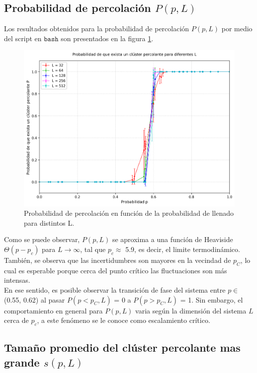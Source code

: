 \documentclass[12pt,a4paper]{article}
\begin{document}
\subsection{Probabilidad de percolación $P(p,L)$}

Los resultados obtenidos para la probabilidad de percolación $P(p,L)$ por medio del script en $\texttt{bash}$ son presentados en la figura \ref{fig:5}.

\begin{figure}[H]
    \centering
   \includegraphics[width=0.9\linewidth]{../figures/P_all_L.png}
   \caption{Probabilidad de percolación en función de la probabilidad de llenado para distintos L.}
    \label{fig:5}
\end{figure}

Como se puede observar, $P(p,L)$ se aproxima a una función de Heaviside $\Theta(p-p_c)$ para $L\rightarrow\infty$, tal que $p_c\approx$ 5.9, es decir, el limite termodinámico. También, se observa que las incertidumbres son mayores en la vecindad de $p_C$, lo cual es esperable porque cerca del punto crítico las fluctuaciones son más intensas.
\\

En ese sentido, es posible observar la transición de fase del sistema entre $p\in$(0.55, 0.62) al pasar $P(p<p_C,L)$ = 0 a $P(p>p_C,L)$ = 1. Sin embargo, el comportamiento en general para $P(p,L)$ varia según la dimensión del sistema $L$ cerca de $p_c$, a este fenómeno se le conoce como escalamiento crítico.

\subsection{Tamaño promedio del clúster percolante mas grande $s(p,L)$}
\end{document}
